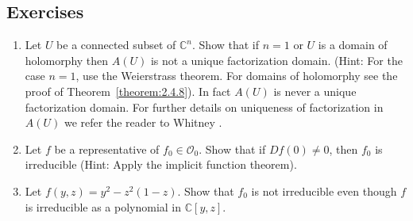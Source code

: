 \subsection*{Exercises}
\begin{enumerate}
\item Let $U$ be a connected subset of $\mathbb C^n$. Show that if $n=1$ or $U$ is a domain of holomorphy then $A(U)$ is not a unique factorization domain. (Hint: For the case $n=1$, use the Weierstrass theorem. For domains of holomorphy see the proof of Theorem~\ref{theorem:2.4.8}). In fact $A(U)$ is never a unique factorization domain. For further details on uniqueness of factorization in $A(U)$ we refer the reader to Whitney \cite[pages 37--40, 332]{bib:I:whitney-h:1}.
\item Let $f$ be a representative of $f_0\in\mathcal O_0$. Show that if $Df(0)\ne0$, then $f_0$ is irreducible (Hint: Apply the implicit function theorem).
\item Let $f(y,z)=y^2-z^2(1-z)$. Show that $f_0$ is not irreducible even though $f$ is irreducible as a polynomial in $\mathbb C[y,z]$.
\end{enumerate}
